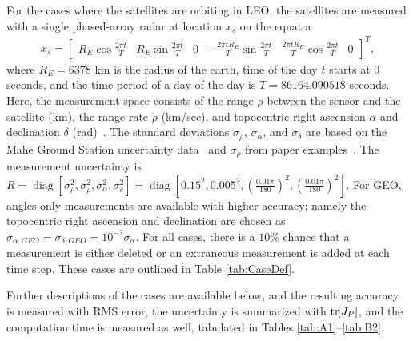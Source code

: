 \documentclass[letterpaper, paper,10pt]{AAS}		%
\newcommand{\diag}{\mathop{\mathrm{diag}}\nolimits}
\newcommand{\bracket}[1]{\ensuremath{\left[ #1 \right]}}
\newcommand{\tr}[1]{\mathrm{tr}\ensuremath{\negthickspace\bracket{#1}}}
\begin{document}
For the cases where the satellites are orbiting in LEO, the satellites are measured with a single phased-array radar at location $x_s$ on the equator
\begin{align}
x_s=
\begin{bmatrix}
R_E\cos\frac{2\pi t}T & R_E\sin\frac{2\pi t}T & 0 & -\frac{2\pi tR_E}T\sin\frac{2\pi t}T  & \frac{2\pi tR_E}T\cos\frac{2\pi t}T & 0
\end{bmatrix}^T,
\end{align}
where $R_E=6378$ km is the radius of the earth, time of the day $t$ starts at $0$ seconds, and the time period of a day of the day is $T=86164.090518$ seconds.
Here, the measurement space consists of the range $\rho$ between the sensor and the satellite (km), the range rate $\dot\rho$ (km/sec), and topocentric right ascension $\alpha$ and declination $\delta$ (rad)~\cite{Val01}.
The standard deviations $\sigma_\rho$, $\sigma_\alpha$, and $\sigma_\delta$ are based on the Mahe Ground Station uncertainty data~\cite{VerSauSco04} and $\sigma_{\dot\rho}$ from paper examples~\cite{KurAriAriEfe10}.
The measurement uncertainty is $R=\diag[\sigma_\rho^2, \sigma_{\dot\rho}^2, \sigma_\alpha^2, \sigma_\delta^2]=\diag[0.15^2, 0.005^2, (\frac{0.01\pi}{180})^2, (\frac{0.01\pi}{180})^2]$.
For GEO, angles-only measurements are available with higher accuracy; namely the topocentric right ascension and declination are chosen as $\sigma_{\alpha,GEO}=\sigma_{\delta,GEO}=10^{-2}\sigma_\alpha$.
For all cases, there is a $10\%$ chance that a measurement is either deleted or an extraneous measurement is added at each time step.
These cases are outlined in Table \ref{tab:CaseDef}.

Further descriptions of the cases are available below, and the resulting accuracy is measured with RMS error, the uncertainty is summarized with $\tr{J_P}$, and the computation time is measured as well, tabulated in Tables \ref{tab:A1}--\ref{tab:B2}.
\end{document}
